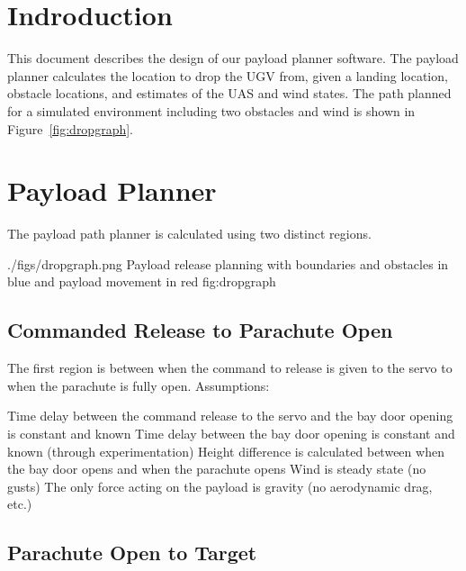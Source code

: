 \documentclass[]{auvsi_doc}
\begin{document}
\begin{AUVSITitlePage}
\begin{artifacttable}
\end{artifacttable}
\end{AUVSITitlePage}


\section{Indroduction}
This document describes the design of our payload planner software. The payload planner calculates the location to drop the UGV from, given a landing location, obstacle locations, and estimates of the UAS and wind states.
The path planned for a simulated environment including two obstacles and wind is shown in Figure~\ref{fig:dropgraph}.
\section{Payload Planner}

The payload path planner is calculated using two distinct regions.


\AUVSIFigure
{./figs/dropgraph.png}
{\textwidth}
{Payload release planning with boundaries and obstacles in blue and payload movement in red}
{fig:dropgraph}

\subsection{Commanded Release to Parachute Open}

The first region is between when the command to release is given to the servo to when the parachute is fully open. Assumptions:

    Time delay between the command release to the servo and the bay door opening is constant and known
    Time delay between the bay door opening is constant and known (through experimentation)
    Height difference is calculated between when the bay door opens and when the parachute opens
    Wind is steady state (no gusts)
    The only force acting on the payload is gravity (no aerodynamic drag, etc.)

\subsection{Parachute Open to Target}
\end{document}
